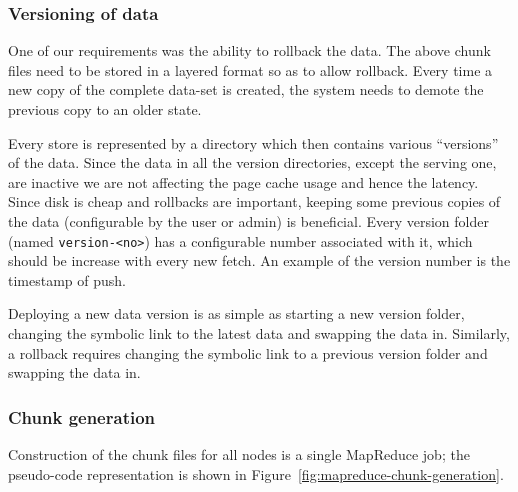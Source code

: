 \subsubsection{Versioning of data}
\label{sec:read_only:versioning}

One of our requirements was the ability to rollback the data. The
above chunk files need to be stored in a layered format so as to allow
rollback. Every time a new copy of the complete data-set is created,
the system needs to demote the previous copy to an older state.

Every store is represented by a directory which then contains various
``versions'' of the data. Since the data in all the version
directories, except the serving one, are inactive we are not affecting
the page cache usage and hence the latency. Since disk is cheap and
rollbacks are important, keeping some previous copies of the data
(configurable by the user or admin) is beneficial. Every version folder
(named \verb=version-<no>=) has a configurable number associated with it, 
which should be increase with every new fetch. An example of the version 
number is the timestamp of push. 

Deploying a new data version is as simple as starting a new version
folder, changing the symbolic link to the latest data and swapping the
data in. Similarly, a rollback requires changing the symbolic link to a 
previous version folder and swapping the data in. 


\subsubsection{Chunk generation}
\label{sec:read_only:chunk_generation}

Construction of the chunk files for all \projectname{} nodes is a
single MapReduce job; the pseudo-code representation is shown in
Figure~\ref{fig:mapreduce-chunk-generation}.


